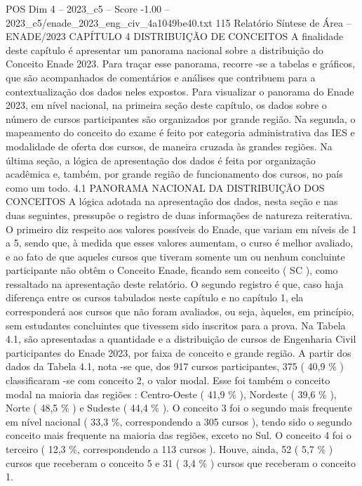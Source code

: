 \begin{textsample}{POS Dim 4 – 2023\_c5 – Score -1.00 – 2023\_c5/enade\_2023\_eng\_civ\_4a1049be40.txt}  \label{ex:f4_pos_277}
115 Relatório Síntese de Área – ENADE/2023 CAPÍTULO 4 DISTRIBUIÇÃO DE CONCEITOS A finalidade deste capítulo é apresentar um panorama nacional sobre a distribuição do Conceito Enade 2023.
Para traçar esse panorama, recorre -se a tabelas e gráficos, que são acompanhados de comentários e análises que contribuem para a contextualização dos dados neles expostos.
Para visualizar o panorama do Enade 2023, em nível nacional, na primeira seção deste capítulo, os dados sobre o número de cursos participantes são organizados por grande região.
Na segunda, o mapeamento do conceito do exame é feito por categoria administrativa das IES e modalidade de oferta dos cursos, de maneira cruzada às grandes regiões.
Na última seção, a lógica de apresentação dos dados é feita por organização acadêmica e, também, por grande região de funcionamento dos cursos, no país como um todo. 4.1 PANORAMA NACIONAL DA DISTRIBUIÇÃO DOS CONCEITOS A lógica adotada na apresentação dos dados, nesta seção e nas duas seguintes, pressupõe o registro de duas informações de natureza reiterativa.
O primeiro diz respeito aos valores possíveis do Enade, que variam em níveis de 1 a 5, sendo que, à medida que esses valores aumentam, o curso é melhor avaliado, e ao fato de que aqueles cursos que tiveram somente um ou nenhum concluinte participante não obtêm o Conceito Enade, ficando sem conceito ( SC ), como ressaltado na apresentação deste relatório.
O segundo registro é que, caso haja diferença entre os cursos tabulados neste capítulo e no capítulo 1, ela corresponderá aos cursos que não foram avaliados, ou seja, àqueles, em princípio, sem estudantes concluintes que tivessem sido inscritos para a prova.
Na Tabela 4.1, são apresentadas a quantidade e a distribuição de cursos de Engenharia Civil participantes do Enade 2023, por faixa de conceito e grande região.
A partir dos dados da Tabela 4.1, nota -se que, dos 917 cursos participantes, 375 ( 40,9 \% ) classificaram -se com conceito 2, o valor modal.
Esse foi também o conceito modal na maioria das regiões : Centro-Oeste ( 41,9 \% ), Nordeste ( 39,6 \% ), Norte ( 48,5 \% ) e Sudeste ( 44,4 \% ).
O conceito 3 foi o segundo mais frequente em nível nacional ( 33,3 \%, correspondendo a 305 cursos ), tendo sido o segundo conceito mais frequente na maioria das regiões, exceto no Sul.
O conceito 4 foi o terceiro ( 12,3 \%, correspondendo a 113 cursos ).
Houve, ainda, 52 ( 5,7 \% ) cursos que receberam o conceito 5 e 31 ( 3,4 \% ) cursos que receberam o conceito 1.

\end{textsample}
